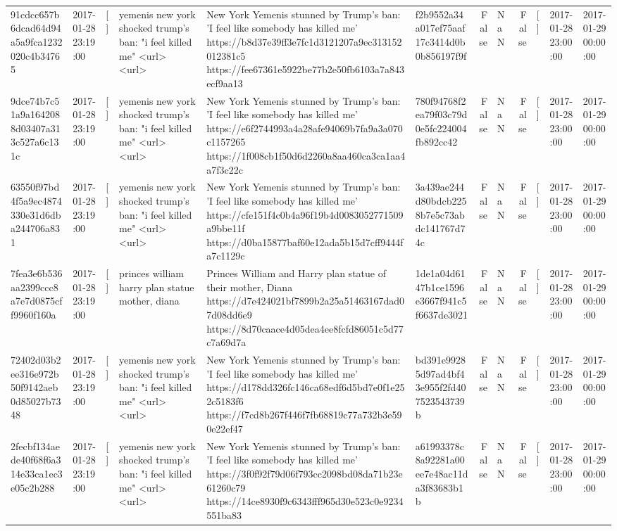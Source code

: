 \begin{tabular}{llllllrlrlll}
91cdcc657b6dcad64d94a5a9fca1232020c4b34765 & 2017-01-28 23:19:00 & [] & yemenis new york shocked trump's ban: "i feel killed me" <url> <url> & New York Yemenis stunned by Trump's ban: 'I feel like somebody has killed me' https://b8d37e39ff3e7fc1d3121207a9ec313152012381c5 https://fee67361e5922be77b2e50fb6103a7a843ecf9aa13 & f2b9552a34a017ef75aaf17c3414d0b0b856197f9f & False & NaN & False & [] & 2017-01-28 23:00:00 & 2017-01-29 00:00:00 \\
9dce74b7c51a9a1642088d03407a313c527a6c131c & 2017-01-28 23:19:00 & [] & yemenis new york shocked trump's ban: "i feel killed me" <url> <url> & New York Yemenis stunned by Trump's ban: 'I feel like somebody has killed me' https://e6f2744993a4a28afe94069b7fa9a3a070c1157265 https://1f008cb1f50d6d2260a8aa460ca3ca1aa4a7f3c22c & 780f94768f2ea79f03c79d0e5fc224004fb892cc42 & False & NaN & False & [] & 2017-01-28 23:00:00 & 2017-01-29 00:00:00 \\
63550f97bd4f5a9ec4874330e31d6dba244706a831 & 2017-01-28 23:19:00 & [] & yemenis new york shocked trump's ban: "i feel killed me" <url> <url> & New York Yemenis stunned by Trump's ban: 'I feel like somebody has killed me' https://cfe151f4c0b4a96f19b4d0083052771509a9bbe11f https://d0ba15877baf60e12ada5b15d7cff9444fa7c1129c & 3a439ae244d80bdcb2258b7e5c73abdc141767d74c & False & NaN & False & [] & 2017-01-28 23:00:00 & 2017-01-29 00:00:00 \\
7fea3e6b536aa2399ccc8a7e7d0875cff9960f160a & 2017-01-28 23:19:00 & [] & princes william harry plan statue mother, diana & Princes William and Harry plan statue of their mother, Diana https://d7e424021bf7899b2a25a51463167dad07d08dd6e9 https://8d70caace4d05dea4ee8fcfd86051c5d77c7a69d7a & 1de1a04d6147b1ce1596e3667f941c5f6637de3021 & False & NaN & False & [] & 2017-01-28 23:00:00 & 2017-01-29 00:00:00 \\
72402d03b2ee316e972b50f9142aeb0d85027b7348 & 2017-01-28 23:19:00 & [] & yemenis new york shocked trump's ban: "i feel killed me" <url> <url> & New York Yemenis stunned by Trump's ban: 'I feel like somebody has killed me' https://d178dd326fc146ca68edf6d5bd7e0f1e252c5183f6 https://f7cd8b267f446f7fb68819c77a732b3e590e22ef47 & bd391e99285d97ad4bf43e955f2fd407523543739b & False & NaN & False & [] & 2017-01-28 23:00:00 & 2017-01-29 00:00:00 \\
2fecbf134aede40f68f6a314e33ca1ec3e05c2b288 & 2017-01-28 23:19:00 & [] & yemenis new york shocked trump's ban: "i feel killed me" <url> <url> & New York Yemenis stunned by Trump's ban: 'I feel like somebody has killed me' https://3f0f92f79d06f793cc2098bd08da71b23e61260c79 https://14ce8930f9c6343fff965d30e523c0e9234551ba83 & a61993378c8a92281a00ee7e48ac11da3f83683b1b & False & NaN & False & [] & 2017-01-28 23:00:00 & 2017-01-29 00:00:00 \\

\end{tabular}
